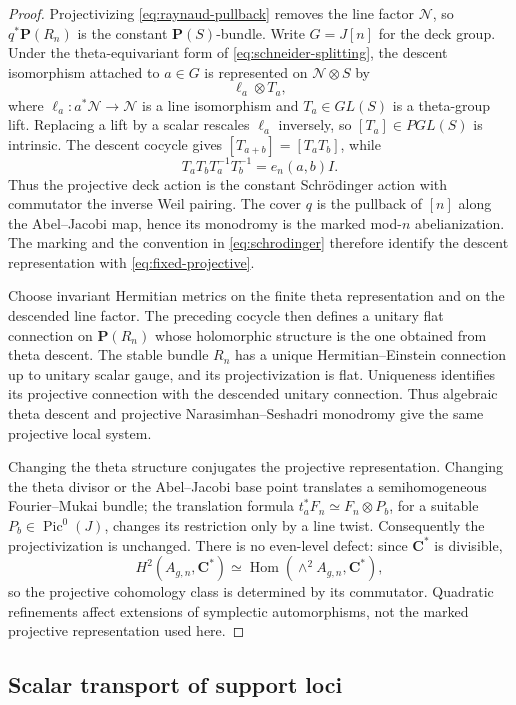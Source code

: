 \documentclass[11pt,reqno]{amsart}
\numberwithin{equation}{section}
\theoremstyle{remark}
\DeclareMathOperator{\Pic}{Pic}
\DeclareMathOperator{\Hom}{Hom}
\newcommand{\bC}{\mathbf C}
\newcommand{\bP}{\mathbf P}
\begin{document}
\begin{proof}
Projectivizing \eqref{eq:raynaud-pullback} removes the line factor
\(\mathcal N\), so \(q^*\bP(R_n)\) is the constant
\(\bP(S)\)-bundle.  Write \(G=J[n]\) for the deck group.  Under the
theta-equivariant form of \eqref{eq:schneider-splitting}, the descent
isomorphism attached to \(a\in G\) is represented on
\(\mathcal N\otimes S\) by
\[
 \ell_a\otimes T_a,
\]
where \(\ell_a\colon a^*\mathcal N\to\mathcal N\) is a line isomorphism
and \(T_a\in GL(S)\) is a theta-group lift.  Replacing a lift by a scalar
rescales \(\ell_a\) inversely, so \([T_a]\in PGL(S)\) is intrinsic.  The
descent cocycle gives
\([T_{a+b}]=[T_aT_b]\), while
\[
 T_aT_bT_a^{-1}T_b^{-1}=e_n(a,b)I.
\]
Thus the projective deck action is the constant Schr\"odinger action
with commutator the inverse Weil pairing.  The cover \(q\) is the
pullback of \([n]\) along the Abel--Jacobi map, hence its monodromy is
the marked mod-\(n\) abelianization.  The marking and the convention in
\eqref{eq:schrodinger} therefore identify the descent representation
with \eqref{eq:fixed-projective}.

Choose invariant Hermitian metrics on the finite theta representation
and on the descended line factor.  The preceding cocycle then defines a
unitary flat connection on \(\bP(R_n)\) whose holomorphic structure is
the one obtained from theta descent.  The stable bundle \(R_n\) has a
unique Hermitian--Einstein connection up to unitary scalar gauge, and its
projectivization is flat.  Uniqueness identifies its projective
connection with the descended unitary connection.  Thus algebraic theta
descent and projective Narasimhan--Seshadri monodromy give the same
projective local system.

Changing the theta structure conjugates the projective representation.
Changing the theta divisor or the Abel--Jacobi base point translates a
semihomogeneous Fourier--Mukai bundle; the translation formula
\(t_a^*F_n\simeq F_n\otimes P_b\), for a suitable
\(P_b\in\Pic^0(J)\), changes its restriction only by a line twist.
Consequently the projectivization is unchanged.  There is no even-level
defect: since \(\bC^*\) is divisible,
\[
 H^2(A_{g,n},\bC^*)\simeq
 \Hom(\wedge^2A_{g,n},\bC^*),
\]
so the projective cohomology class is determined by its commutator.
Quadratic refinements affect extensions of symplectic automorphisms, not
the marked projective representation used here.
\end{proof}

\subsection{Scalar transport of support loci}
\end{document}
